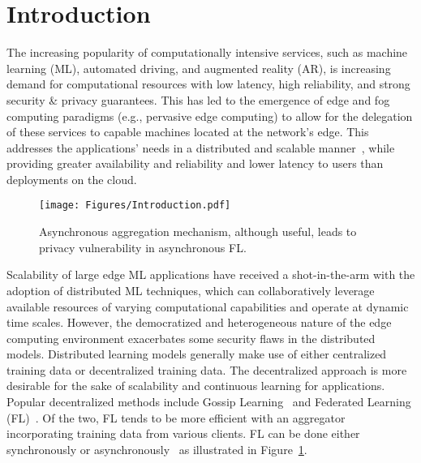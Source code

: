 \section{Introduction}
\label{sec01}
The increasing popularity of computationally intensive services, such as machine learning (ML), automated driving, and augmented reality (AR), is increasing demand for computational resources with low latency, high reliability, and strong security \& privacy guarantees. 
This has led to the emergence of edge and fog computing paradigms (e.g., pervasive edge computing) to allow for the delegation of these services to capable machines located at the network's edge. This addresses the applications' needs in a distributed and scalable manner~\cite{edgeCom}, while providing greater availability and reliability and lower latency to users than deployments on the cloud. 
\begin{figure}[t]
\centering
  \texttt{[image: Figures/Introduction.pdf]} 
  \vspace{-0.3in}
  \caption{Asynchronous aggregation mechanism, although useful, leads to privacy vulnerability in asynchronous FL.}
  \label{fig:Introduction} 
  \vspace{-0.2in}
\end{figure}

Scalability of large edge ML applications have received a shot-in-the-arm with the adoption of distributed ML techniques, which can collaboratively leverage available resources of varying computational capabilities and operate at dynamic time scales.
However, the democratized and heterogeneous nature of the edge computing environment exacerbates some security flaws in the distributed models.  
Distributed learning models generally make use of either centralized training data or decentralized training data. The decentralized approach is more desirable for the sake of scalability and continuous learning for applications.  
Popular decentralized methods include Gossip Learning~\cite{Gossip} and Federated Learning (FL)~\cite{FederatedOpt}. Of the two, FL tends to be more efficient with an aggregator incorporating training data from various clients. 
FL can be done either synchronously or asynchronously~\cite{Caozhazha2024SRFL,FanLiuGon2022AFLGuard} as illustrated in Figure~\ref{fig:Introduction}. 

